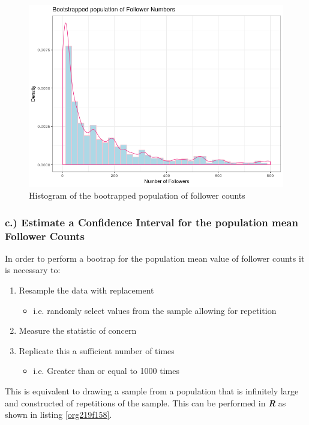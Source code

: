 \documentclass[11pt]{article}
\begin{document}
\begin{figure}[htbp]
\centering
\includegraphics[width=12cm]{./Figures/BootStrap_Pop.png}
\caption{\label{fig:orga337826}Histogram of the bootrapped population of follower counts}
\end{figure}

\subsubsection{c.) Estimate a Confidence Interval for the population mean Follower Counts}
\label{sec:org26e5576}
In order to perform a bootrap for the population mean value of follower counts it is necessary to:

\begin{enumerate}
\item Resample the data with replacement
\begin{itemize}
\item i.e. randomly select values from the sample allowing for repetition
\end{itemize}
\item Measure the statistic of concern
\item Replicate this a sufficient number of times
\begin{itemize}
\item i.e. Greater than or equal to 1000 times \cite[Ch. 5]{davison1997}
\end{itemize}
\end{enumerate}

This is equivalent to drawing a sample from a population that is infinitely large and constructed of repetitions of the sample. This can be performed in \textbf{\emph{R}} as shown in listing \ref{org219f158}.
\end{document}
